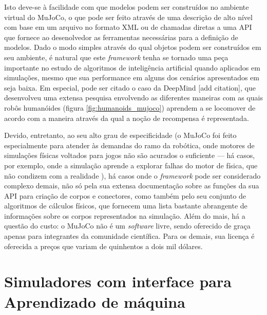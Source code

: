 \documentclass[cic,tc]{iiufrgs}
\begin{document}
Isto deve-se à facilidade com que modelos podem ser construídos no ambiente
virtual do MuJoCo, o que pode ser feito através de uma descrição de alto nível com
base em um arquivo no formato XML ou de chamadas diretas a uma API que fornece
ao desenolvedor as ferramentas necessárias para a definição de modelos. Dado o
modo simples através do qual objetos podem ser construídos em seu ambiente, é
natural que este \textit{framework} tenha se tornado uma peça importante no
estudo de algoritmos de inteligência artificial quando aplicados em simulações,
mesmo que sua performance em alguns dos cenários apresentados em \cite{LeggedRobotics2018} seja
baixa.
Em especial, pode ser citado o caso da DeepMind [add citation], que desenvolveu uma
extensa pesquisa envolvendo as diferentes maneiras com as quais robôs humanóides
(figura \ref{fig:humanoids_mujoco}) aprendem a se locomover de acordo com a
maneira através da qual a noção de recompensa é representada.


Devido, entretanto, ao seu alto grau de especificidade (o MuJoCo foi feito
especialmente para atender às demandas do ramo da robótica, onde motores de
simulações físicas voltados para jogos não são acurados o suficiente --- há
casos, por exemplo, onde a simulação aprende a explorar falhas do motor de
física, que não condizem com a realidade \cite{Sims1994}), há casos onde o
\textit{framework} pode ser considerado complexo demais, não só pela sua
extensa documentação sobre as funções da sua API para criação de corpos e
conectores, como também pelo seu conjunto de algoritmos de cálculos físicos, que
fornecem uma lista bastante abrangente de informações sobre os corpos
representados na simulação. Além do mais, há a questão do custo: o MuJoCo não
é um \textit{software} livre, sendo oferecido de graça apenas para integrantes
da comunidade científica. Para os demais, sua licença é oferecida a preços que
variam de quinhentos a dois mil dólares.

\noindent\makebox[\linewidth]{\rule{\paperwidth}{0.4pt}}

\section{Simuladores com interface para Aprendizado de máquina}

\end{document}

